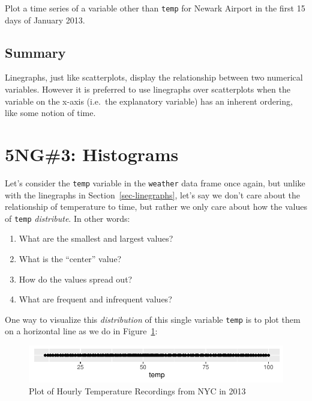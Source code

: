 \documentclass[
  letterpaper,
  DIV=11,
  numbers=noendperiod]{scrreprt}
\providecommand{\tightlist}{%
  \setlength{\itemsep}{0pt}\setlength{\parskip}{0pt}}\usepackage{longtable,booktabs,array}
\theoremstyle{definition}
\theoremstyle{remark}
\begin{document}
\begin{tcolorbox}[enhanced jigsaw, coltitle=black, toprule=.15mm, bottomtitle=1mm, breakable, leftrule=.75mm, title={{🎯} Learning Check 2.13}, opacitybacktitle=0.6, colback=white, rightrule=.15mm, opacityback=0, toptitle=1mm, colbacktitle=quarto-callout-tip-color!10!white, colframe=quarto-callout-tip-color-frame, titlerule=0mm, arc=.35mm, bottomrule=.15mm, left=2mm]
Plot a time series of a variable other than \texttt{temp} for Newark
Airport in the first 15 days of January 2013.
\end{tcolorbox}

\hypertarget{summary-1}{%
\subsection{Summary}\label{summary-1}}

Linegraphs, just like scatterplots, display the relationship between two
numerical variables. However it is preferred to use linegraphs over
scatterplots when the variable on the x-axis (i.e.~the explanatory
variable) has an inherent ordering, like some notion of time.

\hypertarget{sec-histograms}{%
\section{5NG\#3: Histograms}\label{sec-histograms}}

Let's consider the \texttt{temp} variable in the \texttt{weather} data
frame once again, but unlike with the linegraphs in
Section~\ref{sec-linegraphs}, let's say we don't care about the
relationship of temperature to time, but rather we only care about how
the values of \texttt{temp} \emph{distribute}. In other words:

\begin{enumerate}
\def\labelenumi{\arabic{enumi}.}
\tightlist
\item
  What are the smallest and largest values?
\item
  What is the ``center'' value?
\item
  How do the values spread out?
\item
  What are frequent and infrequent values?
\end{enumerate}

One way to visualize this \emph{distribution} of this single variable
\texttt{temp} is to plot them on a horizontal line as we do in
Figure~\ref{fig-temp-on-line}:

\begin{figure}

{\centering \includegraphics{02-visualization_files/figure-pdf/fig-temp-on-line-1.pdf}

}

\caption{\label{fig-temp-on-line}Plot of Hourly Temperature Recordings
from NYC in 2013}

\end{figure}
\end{document}
